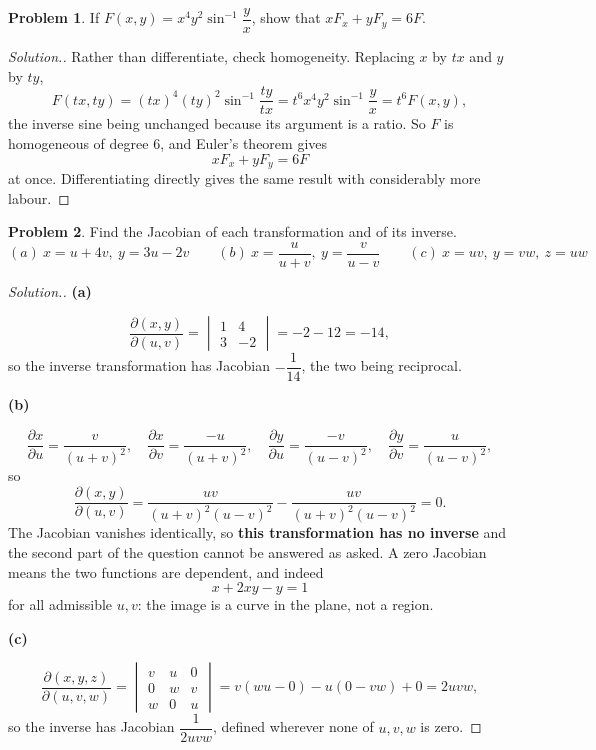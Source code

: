 \documentclass[11pt,a4paper]{article}
\theoremstyle{definition}
\newtheorem{problemx}{Problem}[subsection]
\newenvironment{problem}{\begin{problemx}}{\end{problemx}}
\newenvironment{solution}
  {\renewcommand{\qedsymbol}{}\begin{proof}[\textit{Solution}.]}
  {\end{proof}}
\newcommand{\subhead}[1]{%
  \par\medskip\noindent\textbf{#1}\par\nobreak\smallskip}
\begin{document}
\begin{problem}
If $F(x,y) = x^4y^2\sin^{-1}\dfrac{y}{x}$, show that
$x F_x + y F_y = 6F$.
\end{problem}
\begin{solution}
Rather than differentiate, check homogeneity. Replacing $x$ by $tx$ and $y$ by
$ty$,
\[F(tx,ty) = (tx)^4(ty)^2\sin^{-1}\frac{ty}{tx}
= t^6x^4y^2\sin^{-1}\frac{y}{x} = t^6F(x,y),\]
the inverse sine being unchanged because its argument is a ratio. So $F$ is
homogeneous of degree $6$, and Euler's theorem gives
\[xF_x + yF_y = 6F\]
at once. Differentiating directly gives the same result with considerably more
labour.
\end{solution}

\begin{problem}
Find the Jacobian of each transformation and of its inverse.
\[(a)\ x = u+4v,\ y = 3u-2v\qquad 
(b)\ x = \frac{u}{u+v},\ y = \frac{v}{u-v}\qquad 
(c)\ x = uv,\ y = vw,\ z = uw\]
\end{problem}
\begin{solution}
\subhead{(a)}
\[\frac{\partial(x,y)}{\partial(u,v)}
= \begin{vmatrix} 1 & 4\\ 3 & -2\end{vmatrix} = -2-12 = -14 ,\]
so the inverse transformation has Jacobian $-\dfrac{1}{14}$, the two being
reciprocal.

\subhead{(b)}
\[\frac{\partial x}{\partial u} = \frac{v}{(u+v)^2},\quad
\frac{\partial x}{\partial v} = \frac{-u}{(u+v)^2},\quad
\frac{\partial y}{\partial u} = \frac{-v}{(u-v)^2},\quad
\frac{\partial y}{\partial v} = \frac{u}{(u-v)^2},\]
so
\[\frac{\partial(x,y)}{\partial(u,v)}
= \frac{uv}{(u+v)^2(u-v)^2} - \frac{uv}{(u+v)^2(u-v)^2} = 0 .\]
The Jacobian vanishes identically, so \textbf{this transformation has no
inverse} and the second part of the question cannot be answered as asked. A zero
Jacobian means the two functions are dependent, and indeed
\[x + 2xy - y = 1\]
for all admissible $u,v$: the image is a curve in the plane, not a region.

\subhead{(c)}
\[\frac{\partial(x,y,z)}{\partial(u,v,w)}
= \begin{vmatrix}
v & u & 0\\
0 & w & v\\
w & 0 & u
\end{vmatrix}
= v(wu-0) - u(0-vw) + 0 = 2uvw ,\]
so the inverse has Jacobian $\dfrac{1}{2uvw}$, defined wherever none of
$u,v,w$ is zero.
\end{solution}
\end{document}
